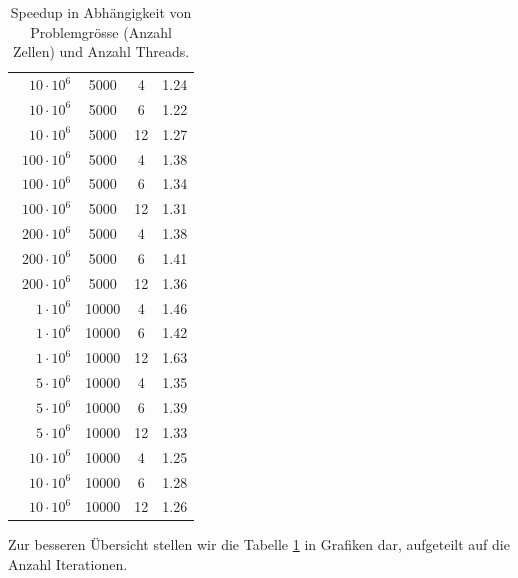\begin{table}
\begin{tabular}{c c c c}
		
		$\phantom{00}10 \cdot 10^6$ & \phantom{0}5000 & \phantom{0}4 & 1.24\\
		$\phantom{00}10 \cdot 10^6$ & \phantom{0}5000 & \phantom{0}6 & 1.22\\
		$\phantom{00}10 \cdot 10^6$ & \phantom{0}5000 & 12           & 1.27\\
		
		$\phantom{0}100 \cdot 10^6$ & \phantom{0}5000 & \phantom{0}4 & 1.38\\
		$\phantom{0}100 \cdot 10^6$ & \phantom{0}5000 & \phantom{0}6 & 1.34\\
		$\phantom{0}100 \cdot 10^6$ & \phantom{0}5000 & 12           & 1.31\\
		
		$\phantom{0}200 \cdot 10^6$ & \phantom{0}5000 & \phantom{0}4 & 1.38\\
		$\phantom{0}200 \cdot 10^6$ & \phantom{0}5000 & \phantom{0}6 & 1.41\\
		$\phantom{0}200 \cdot 10^6$ & \phantom{0}5000 & 12           & 1.36\\
		
		$\phantom{000}1 \cdot 10^6$ &           10000 & \phantom{0}4  & 1.46 \\
		$\phantom{000}1 \cdot 10^6$ &           10000 & \phantom{0}6  & 1.42 \\
		$\phantom{000}1 \cdot 10^6$ &           10000 & 12            & 1.63\\
		
		$\phantom{000}5 \cdot 10^6$ &           10000 & \phantom{0}4  & 1.35 \\
		$\phantom{000}5 \cdot 10^6$ &           10000 & \phantom{0}6  & 1.39 \\
		$\phantom{000}5 \cdot 10^6$ &           10000 & 12            & 1.33\\
		
		$\phantom{00}10 \cdot 10^6$ &           10000 & \phantom{0}4  & 1.25 \\
		$\phantom{00}10 \cdot 10^6$ &           10000 & \phantom{0}6  & 1.28 \\
		$\phantom{00}10 \cdot 10^6$ &           10000 & 12            & 1.26\\
		
		
	\end{tabular}
	\caption{Speedup in Abhängigkeit von Problemgrösse (Anzahl Zellen) und Anzahl Threads.}
	\label{parallelisierung:table:speedup}
\end{table}

Zur besseren Übersicht stellen wir die Tabelle
\ref{parallelisierung:table:speedup}
in Grafiken dar, aufgeteilt auf die Anzahl Iterationen.
	
